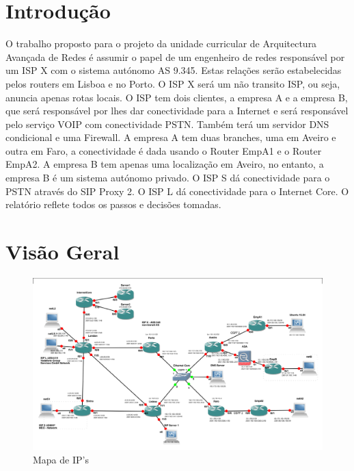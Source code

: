 \documentclass[pdftex,12pt,a4paper]{report}
\begin{document}
\renewcommand{\headrulewidth}{0pt}

\fancyhead{}
\fancyfoot{}
\rfoot{\thepage}

\renewcommand*\contentsname{Conteúdos}
\renewcommand*\figurename{Figura}
\renewcommand*\tablename{Tabela}

\tableofcontents
\renewcommand{\headrulewidth}{0.15pt}
\renewcommand{\thechapter}{}

\clearpage

\section{Introdução}
O trabalho proposto para o projeto da unidade curricular de Arquitectura Avançada de Redes é assumir o papel de um engenheiro de redes responsável por um ISP X com o sistema autónomo AS 9.345.
Estas relações serão estabelecidas pelos routers em Lisboa e no Porto.  O ISP X será um não transito ISP, ou seja, anuncia apenas rotas locais.
O ISP tem dois clientes, a empresa A e a empresa B, que será responsável por lhes dar conectividade para a Internet e será responsável pelo serviço VOIP com conectividade PSTN. Também terá um servidor DNS condicional e uma Firewall.
A empresa A tem duas branches, uma em Aveiro e outra em Faro, a conectividade é dada usando o Router EmpA1 e o Router EmpA2.
A empresa B tem apenas uma localização em Aveiro, no entanto, a empresa B é um sistema autónomo privado.
O ISP S dá conectividade para o PSTN através do SIP Proxy 2. O ISP L dá conectividade para o Internet Core.
O relatório reflete todos os passos e decisões tomadas.

\clearpage

\section{Visão Geral}

\begin{figure}[!htb]
\center
 \includegraphics[width=150mm,scale=1]{imagens/mapa.png}
 \caption{Mapa de IP's}
 \label{fig:mapadeips}
\end{figure}
\end{document}

